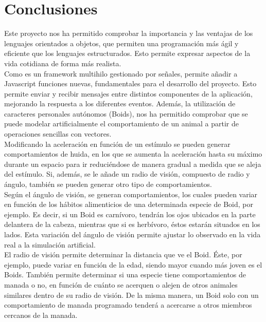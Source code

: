 \section{Conclusiones}
\label{chap:conclusiones}

Este proyecto nos ha permitido comprobar la importancia y las ventajas de los lenguajes orientados a objetos, que permiten una programación más 
ágil y eficiente que los lenguajes estructurados. Esto permite expresar aspectos de la vida cotidiana de forma más realista.\\

Como \lluvia{} es un framework multihilo gestionado por señales, permite añadir a Javascript funciones nuevas, fundamentales para el desarrollo 
del proyecto. Esto permite enviar y recibir mensajes entre distintos componentes de la aplicación, mejorando la respuesta a los diferentes 
eventos. Además, la utilización de caracteres personales autónomos (Boids), nos ha permitido comprobar que se puede modelar artificialmente el 
comportamiento de un animal a partir de operaciones sencillas con vectores.\\

Modificando la aceleración en función de un estímulo se pueden generar comportamientos de huida, en los que se aumenta la aceleración hasta 
su máximo durante un espacio para ir reduciéndose de manera gradual a medida que se aleja del estímulo.
Si, además, se le añade un radio de visión, compuesto de radio y ángulo, también se pueden generar otro tipo de comportamientos.\\

Según el ángulo de visión, se generan comportamientos, los cuales pueden variar en función de los hábitos alimenticios de 
una determinada especie de Boid, por ejemplo. Es decir, si un Boid es carnívoro, tendrán los ojos ubicados en la parte delantera de la cabeza,
mientras que si es herbívoro, éstos estarán situados en los lados. Esta variación del ángulo de visión permite ajustar lo observado en la vida 
real a la simulación artificial.\\

El radio de visión permite determinar la distancia que ve el Boid. Éste, por ejemplo, puede variar en función de la edad, siendo mayor cuando
más joven es el Boids. También permite determinar si una especie tiene comportamientos de manada o no, en función de cuánto se acerquen o 
alejen de otros animales similares dentro de su radio de visión. De la misma manera, un Boid solo con un comportamiento de manada programado 
tenderá a acercarse a otros miembros cercanos de la manada.\\

